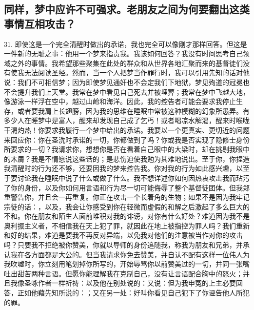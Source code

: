 
\subsection{同样，梦中应许不可强求。老朋友之间为何要翻出这类事情互相攻击？}

31. 即使这是一个完全清醒时做出的承诺，我也完全可以像刚才那样回答。但这是一件新的无耻之事：他用一个梦来指责我。我该如何回答？我没有时间思考自己领域之外的事情。我希望那些聚集在此处的群众和从世界各地汇聚而来的基督徒们没有使我无法阅读圣经。然而，当一个人把梦当作罪行时，我可以引用先知的话对他说：我们不可相信梦；因为即使梦见通奸也不会定我们下地狱，梦见殉道的冠冕也不会提升我们上天堂。我常在梦中看见自己死去并被埋葬；我常在梦中飞越大地，像游泳一样浮在空中，越过山岭和海洋。因此，我的控告者可能会要求我停止生存，或者要我肩上长翅膀，因为我的思维在睡眠中常被这种模糊的幻象所愚弄。有多少人在睡梦中是富人，醒来却发现自己成了乞丐！或者喝凉水解渴，醒来时喉咙干渴灼热！你要求我履行一个梦中给出的承诺。我要以一个更真实、更切近的问题来回应你：你在圣洗时承诺的一切，你都做到了吗？你或我是否实现了隐修士身份所要求的一切？我请求你，想想你是否在看着自己眼中的大梁时，却在挑剔我眼中的木屑？我是不情愿说这些话的；是悲伤迫使我勉为其难地说出。至于你，你捏造我清醒时的行为还不够，还要因我的梦来控告我。你对我的行为如此感兴趣，以至于要讨论我在睡眠中说了什么或做了什么。我不想详述你如何因热衷攻击我而玷污了你的身份，以及你如何用言语和行为尽一切可能侮辱了整个基督徒团体。但我郑重警告你，并且会一再重复。你正在攻击一个长着角的生物；如果不是因为我牢记宗徒的话：，以及，我会让你感受到你在轻微而虚假的和解之后激起了多么巨大的不和。你在朋友和陌生人面前堆积对我的诽谤，对你有什么好处？难道因为我不是奥利振主义者，不相信我在天上犯了罪，就因此在地上被指控为罪人吗？我们重新和好的结果，难道是要我不再反对异端，以免我对他们的注意被当作对你的攻击吗？只要我不拒绝被你赞美，你就以导师的身份追随我，称我为朋友和兄弟，并承认我在各方面都是大公的。但当我请求你免去赞美，并自认不配有这样一位伟人为我吹嘘时，你立刻用笔划掉你所写的，开始辱骂你以前赞美过的一切，并同一张嘴吐出甜苦两种言语。但愿你能理解我在克制自己，没有让言语配合胸中的怒火；并且我像圣咏作者一样祈祷：以及他在别处说的：又说：但为我申冤的上主必要回答，正如他藉先知所说的：；又在另一处：好叫你看见自己犯下了你诬告他人所犯的罪。\par

